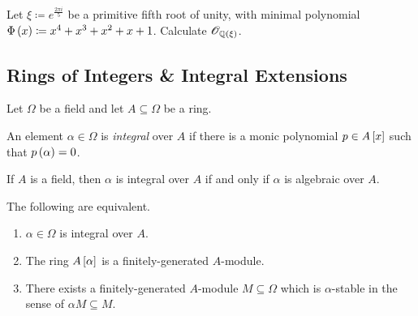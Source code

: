 \documentclass[11pt]{article}
\begin{document}
\begin{exercise}
Let $\xi \coloneqq e^{\frac{2 \pi i}{5}}$ be a primitive fifth root of unity, with minimal polynomial $\Phi\left( x \right) \coloneqq x^4 + x^3 + x^2 + x + 1$. Calculate $\mathcal{O}_{\mathbb{Q}\left( \xi \right)}$.
\end{exercise}

\subsection{Rings of Integers \& Integral Extensions}

Let $\Omega$ be a field and let $A \subseteq \Omega$ be a ring.

\begin{definition}
An element $\alpha \in \Omega$ is \emph{integral} over $A$ if there is a monic polynomial $p \in A\left[ x \right]$ such that $p\left( \alpha \right) = 0$.
\end{definition}

\begin{example}
If $A$ is a field, then $\alpha$ is integral over $A$ if and only if $\alpha$ is algebraic over $A$.
\end{example}

\begin{theorem}\label{theorem:integral_element_condition}
The following are equivalent.

\begin{enumerate}
\item $\alpha \in \Omega$ is integral over $A$.
\item The ring $A\left[ \alpha \right]$ is a finitely-generated $A$-module.
\item There exists a finitely-generated $A$-module $M \subseteq \Omega$ which is $\alpha$-stable in the sense of $\alpha M \subseteq M$.
\end{enumerate}
\end{theorem}
\end{document}
